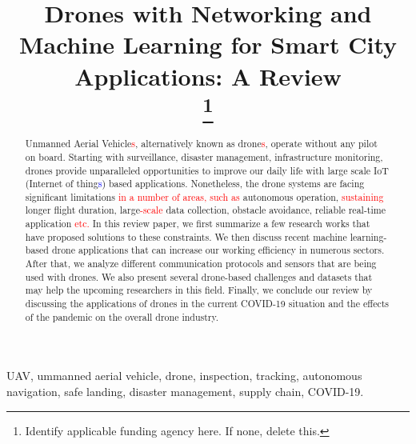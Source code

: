 \documentclass[conference, final]{IEEEtran}
\begin{document}
\title{Drones with Networking and Machine Learning for Smart City Applications: A Review\\
\thanks{Identify applicable funding agency here. If none, delete this.}
}

\author{
}

\maketitle

\begin{abstract}
Unmanned Aerial Vehicle\textcolor{red}{s}, alternatively known as drone\textcolor{red}{s}, operate without any pilot on board. Starting with
surveillance, disaster management, infrastructure monitoring, drones provide unparalleled opportunities to improve our daily life with large scale IoT (Internet of thing\textcolor{blue}{s}) based applications. Nonetheless, the drone systems are facing significant limitations \textcolor{red}{in a number of areas, such as} autonomous operation, \textcolor{red}{sustaining} longer flight duration, large\textcolor{red}{-scale} data collection,
obstacle avoidance, reliable real-time application \textcolor{red}{etc.} In this review paper, we first summarize a few research works that have proposed solutions to these constraints. We then discuss recent machine learning-based drone applications that can increase our working efficiency in numerous sectors. After that, we analyze different communication protocols and sensors that are being used with drones. We also present several drone-based challenges and datasets that may help the upcoming researchers in this field. Finally, we conclude our review by discussing the applications of drones in the current COVID-19 situation and the effects of the pandemic on the overall drone industry.

\end{abstract}

\begin{IEEEkeywords}
UAV, ummanned aerial vehicle, drone, inspection, tracking, autonomous navigation, safe landing, disaster management, supply chain, COVID-19.
\end{IEEEkeywords}
\end{document}
